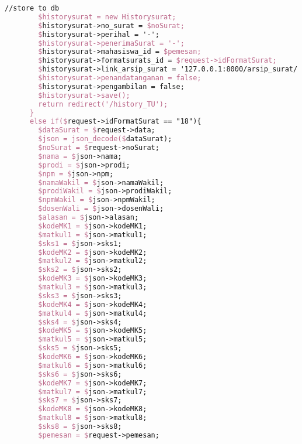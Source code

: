 \begin{lstlisting}[language=tex,basicstyle=\tiny,caption=HistorysuratController.php]
        //store to db
        $historysurat = new Historysurat;
        $historysurat->no_surat = $noSurat;
        $historysurat->perihal = '-';
        $historysurat->penerimaSurat = '-';
        $historysurat->mahasiswa_id = $pemesan;
        $historysurat->formatsurats_id = $request->idFormatSurat;
        $historysurat->link_arsip_surat = '127.0.0.1:8000/arsip_surat/' . $noSurat. '_' . $npm . '_surat_perwakilan_perwalian_7mk.pdf';
        $historysurat->penandatanganan = false;
        $historysurat->pengambilan = false;
        $historysurat->save();
        return redirect('/history_TU');
      }
      else if($request->idFormatSurat == "18"){
        $dataSurat = $request->data;
        $json = json_decode($dataSurat);
        $noSurat = $request->noSurat;
        $nama = $json->nama;
        $prodi = $json->prodi;
        $npm = $json->npm;
        $namaWakil = $json->namaWakil;
        $prodiWakil = $json->prodiWakil;
        $npmWakil = $json->npmWakil;
        $dosenWali = $json->dosenWali;
        $alasan = $json->alasan;
        $kodeMK1 = $json->kodeMK1;
        $matkul1 = $json->matkul1;
        $sks1 = $json->sks1;
        $kodeMK2 = $json->kodeMK2;
        $matkul2 = $json->matkul2;
        $sks2 = $json->sks2;
        $kodeMK3 = $json->kodeMK3;
        $matkul3 = $json->matkul3;
        $sks3 = $json->sks3;
        $kodeMK4 = $json->kodeMK4;
        $matkul4 = $json->matkul4;
        $sks4 = $json->sks4;
        $kodeMK5 = $json->kodeMK5;
        $matkul5 = $json->matkul5;
        $sks5 = $json->sks5;
        $kodeMK6 = $json->kodeMK6;
        $matkul6 = $json->matkul6;
        $sks6 = $json->sks6;
        $kodeMK7 = $json->kodeMK7;
        $matkul7 = $json->matkul7;
        $sks7 = $json->sks7;
        $kodeMK8 = $json->kodeMK8;
        $matkul8 = $json->matkul8;
        $sks8 = $json->sks8;
        $pemesan = $request->pemesan;


\end{lstlisting}
